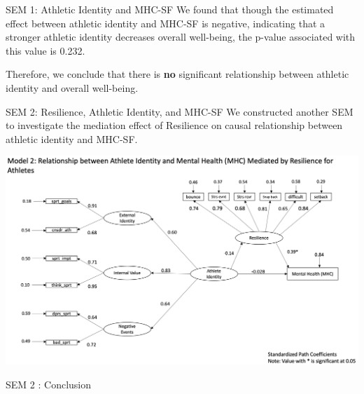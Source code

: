 \documentclass[
  ignorenonframetext,
]{beamer}
\begin{document}
\begin{frame}{SEM 1: Athletic Identity and MHC-SF}
\protect\hypertarget{sem-1-athletic-identity-and-mhc-sf-1}{}
We found that though the estimated effect between athletic identity and
MHC-SF is negative, indicating that a stronger athletic identity
decreases overall well-being, the p-value associated with this value is
0.232.

Therefore, we conclude that there is \textbf{no} significant
relationship between athletic identity and overall well-being.
\end{frame}

\begin{frame}{SEM 2: Resilience, Athletic Identity, and MHC-SF}
\protect\hypertarget{sem-2-resilience-athletic-identity-and-mhc-sf}{}
We constructed another SEM to investigate the mediation effect of
Resilience on causal relationship between athletic identity and MHC-SF.

\centering

\includegraphics{images/SEM_2.png}
\end{frame}

\begin{frame}{SEM 2 : Conclusion}
\protect\hypertarget{sem-2-conclusion}{}
\end{frame}
\end{document}
